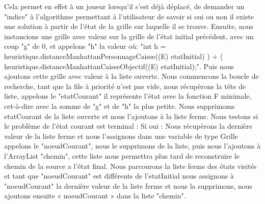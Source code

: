 \documentclass[a4paper,12pt]{article} %
\begin{document}
\newline\newline
Cela permet en effet à un joueur lorsqu’il s’est déjà déplacé, de demander un "indice" à l’algorithme permettant à l’utilisateur de savoir si oui ou non il existe une solution à partir de l’état de la grille sur laquelle il se trouve. 
\newline\newline	
Ensuite, nous instancions une grille avec valeur sur la grille de l’état initial précédent, avec un coup "g" de 0, et appelons "h" la valeur où: 
\newline\newline
"int h = heuristique.distanceManhattanPersonnageCaisse((E) etatInitial) ) 
\newline
+ ( heuristique.distanceManhattanCaisseObjectif((E) etatInitial);".
\newline\newline
Puis nous ajoutons cette grille avec valeur à la liste ouverte.
\newline\newline
Nous commencons la boucle de recherche, tant que la file à priorité n’est pas vide, nous récupèrons la tête de liste, appelons le "etatCourant" il représente l’état avec la fonction F minimale, cet-à-dire avec la somme de "g" et de "h" la plus petite.
\newline\newline
Nous supprimoms etatCourant de la liste ouverte et nous l’ajoutons à la liste ferme.
\newpage
\noindent
Nous testons si le problème de l’état courant est terminal :
\newline\newline
Si oui : 
\newline\newline
Nous récupèrons la dernière valeur de la liste ferme et nous l’assignons dans une variable de type Grille appelons le "noeudCourant", nous le supprimons de la liste, puis nous l’ajoutons à l’ArrayList "chemin", cette liste nous permettra plus tard de reconstruire le chemin de la source a l’état final.
\newline\newline
Nous parcourons la liste ferme des états visités et tant que "noeudCourant" est différents de l’etatInitial nous assignons à "noeudCourant" la dernière valeur de la liste ferme et nous la supprimons, nous ajoutons ensuite « noeudCourant » dans la liste "chemin".
\newline\newline
\end{document}
